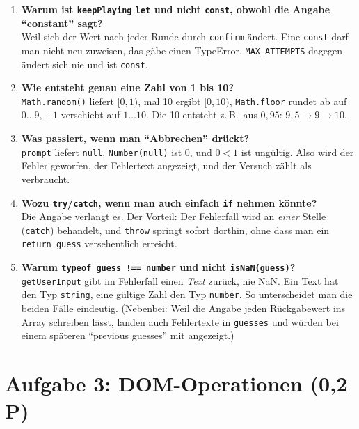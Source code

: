 \documentclass[a4paper,11pt]{article}
\begin{document}
\begin{tutor}
\begin{enumerate}[leftmargin=*]
\item \textbf{Warum ist \texttt{keepPlaying} \texttt{let} und nicht \texttt{const}, obwohl die Angabe "`constant"' sagt?}\\
  Weil sich der Wert nach jeder Runde durch \texttt{confirm} ändert. Eine \texttt{const} darf man nicht neu
  zuweisen, das gäbe einen TypeError. \texttt{MAX\_ATTEMPTS} dagegen ändert sich nie und ist \texttt{const}.
\item \textbf{Wie entsteht genau eine Zahl von 1 bis 10?}\\
  \texttt{Math.random()} liefert $[0,1)$, mal 10 ergibt $[0,10)$, \texttt{Math.floor} rundet ab auf $0\dots9$,
  $+1$ verschiebt auf $1\dots10$. Die 10 entsteht z.\,B.\ aus $0{,}95$: $9{,}5 \to 9 \to 10$.
\item \textbf{Was passiert, wenn man "`Abbrechen"' drückt?}\\
  \texttt{prompt} liefert \texttt{null}, \texttt{Number(null)} ist 0, und $0 < 1$ ist ungültig. Also wird der
  Fehler geworfen, der Fehlertext angezeigt, und der Versuch zählt als verbraucht.
\item \textbf{Wozu \texttt{try}/\texttt{catch}, wenn man auch einfach \texttt{if} nehmen könnte?}\\
  Die Angabe verlangt es. Der Vorteil: Der Fehlerfall wird an \emph{einer} Stelle (\texttt{catch}) behandelt, und
  \texttt{throw} springt sofort dorthin, ohne dass man ein \texttt{return guess} versehentlich erreicht.
\item \textbf{Warum \texttt{typeof guess !== \textquotedbl{}number\textquotedbl{}} und nicht \texttt{isNaN(guess)}?}\\
  \texttt{getUserInput} gibt im Fehlerfall einen \emph{Text} zurück, nie NaN. Ein Text hat den Typ
  \texttt{\textquotedbl{}string\textquotedbl{}}, eine gültige Zahl den Typ \texttt{\textquotedbl{}number\textquotedbl{}}. So unterscheidet man die beiden Fälle eindeutig.
  (Nebenbei: Weil die Angabe jeden Rückgabewert ins Array schreiben lässt, landen auch Fehlertexte in
  \texttt{guesses} und würden bei einem späteren "`previous guesses"' mit angezeigt.)
\end{enumerate}
\end{tutor}

\section{Aufgabe 3: DOM-Operationen (0,2 P)}\label{sec:a3}
\end{document}
